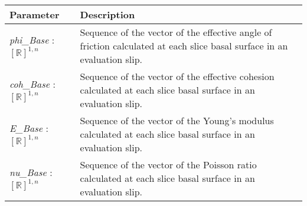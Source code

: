 \documentclass[12pt, titlepage]{article}
\begin{document}
\begin{center}
\begin{longtable}{p{} p{}}
  \hline \textbf{Parameter} & \textbf{Description} \\ \hline

  \textit{phi\_Base} : $[\mathbb{R}]^{1,n}$ & Sequence of the vector
  of the effective angle of friction calculated at each slice basal
  surface in an evaluation slip.\\

  \textit{coh\_Base} : $[\mathbb{R}]^{1,n}$ & Sequence of the vector
  of the effective cohesion calculated at each slice basal surface in
  an evaluation slip.\\

  \textit{E\_Base} : $[\mathbb{R}]^{1,n}$ & Sequence of the vector of
  the Young's modulus calculated at each slice basal surface in an
  evaluation slip.\\

  \textit{nu\_Base} : $[\mathbb{R}]^{1,n}$ & Sequence of the vector of
  the Poisson ratio calculated at each slice basal surface in an
  evaluation slip.  \\ \hline
\end{longtable}
\end{center}
\end{document}
